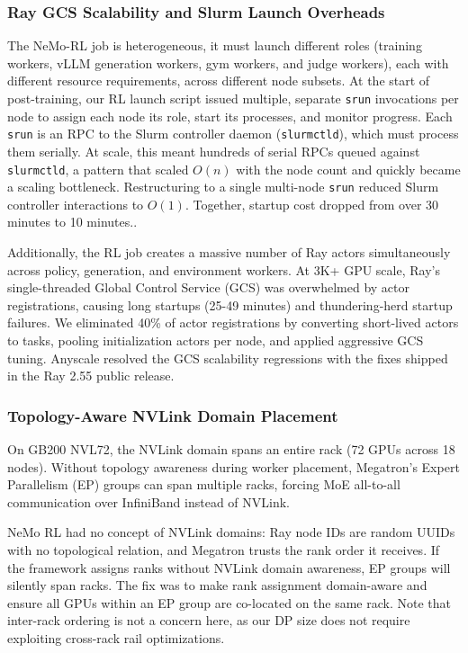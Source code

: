 \subsubsection*{Ray GCS Scalability and Slurm Launch Overheads}
The NeMo-RL job is heterogeneous, it must launch different roles (training workers, vLLM generation workers, gym workers, and judge workers), each with different resource requirements,  across different node subsets. At the start of post-training, our RL launch script issued multiple, separate \texttt{srun} invocations per node to assign each node its role, start its processes, and monitor progress. Each \texttt{srun} is an RPC to the Slurm controller daemon (\texttt{slurmctld}), which must process them serially. At scale, this meant hundreds of serial RPCs queued against \texttt{slurmctld}, a pattern that scaled $O(n)$ with the node count and quickly became a scaling bottleneck. Restructuring to a single multi-node \texttt{srun} reduced Slurm controller interactions to $O(1)$. Together, startup cost dropped from over 30 minutes to 10 minutes..

Additionally, the RL job creates a massive number of Ray actors simultaneously across policy, generation, and environment workers. At 3K+ GPU scale, Ray's single-threaded Global Control Service (GCS) was overwhelmed by actor registrations, causing long startups (25-49 minutes) and thundering-herd startup failures. We eliminated 40\% of actor registrations by converting short-lived actors to tasks, pooling initialization actors per node, and applied aggressive GCS tuning. Anyscale resolved the GCS scalability regressions with the fixes shipped in the Ray 2.55 public release.

\subsubsection*{Topology-Aware NVLink Domain Placement}

On GB200 NVL72, the NVLink domain spans an entire rack (72 GPUs across 18 nodes). Without
topology awareness during worker placement, Megatron's Expert Parallelism (EP) groups can span multiple
racks, forcing MoE all-to-all communication over InfiniBand instead of NVLink.

NeMo RL had no concept of NVLink domains: Ray node IDs are random UUIDs with no
topological relation, and Megatron trusts the rank order it receives. If the
framework assigns ranks without NVLink domain awareness, EP groups will silently
span racks. The fix was to make rank assignment domain-aware and ensure all GPUs
within an EP group are co-located on the same rack. Note that inter-rack ordering
is not a concern here, as our DP size does not require exploiting cross-rack rail
optimizations.

